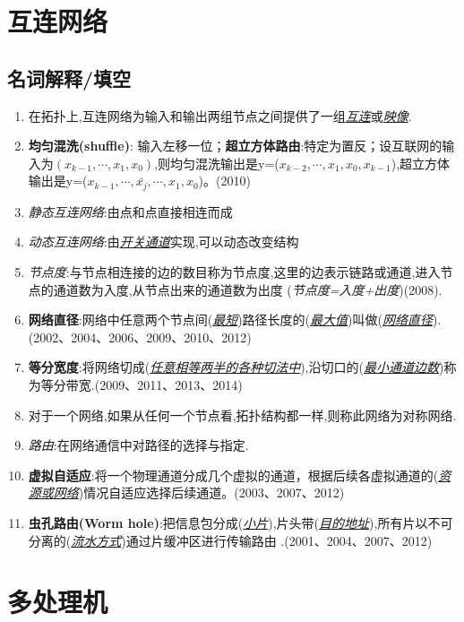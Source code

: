 \documentclass[a4paper]{ctexart}
\newcommand{\blank}[1]{(\emph{\underline{#1}})}
\begin{document}
\newpage
\section{互连网络}
\subsection{名词解释/填空}
\begin{enumerate}
  \item 在拓扑上,互连网络为输入和输出两组节点之间提供了一组\emph{\underline{互连}}或\emph{\underline{映像}}.
  \item \textbf{均匀混洗(shuffle)}: 输入左移一位；\textbf{超立方体路由}:特定为置反；设互联网的输入为$(x_{k-1},\cdots,x_1,x_0)$,则均匀混洗输出是y=\blank{$x_{k-2},\cdots,x_1,x_0,x_{k-1}$},超立方体输出是y=\blank{$x_{k-1},\cdots,\bar{x_j},\cdots,x_1,x_0$}。(2010)
  \item \emph{静态互连网络}:由点和点直接相连而成
  \item \emph{动态互连网络}:由\underline{\emph{开关通道}}实现,可以动态改变结构
  \item \emph{节点度}:与节点相连接的边的数目称为节点度,这里的边表示链路或通道,进入节点的通道数为入度,从节点出来的通道数为出度
  (\emph{节点度=入度+出度})(2008).
  \item \textbf{网络直径}:网络中任意两个节点间\blank{最短}路径长度的\blank{最大值}叫做(\emph{\underline{网络直径}}).(2002、2004、2006、2009、2010、2012)
  \item \textbf{等分宽度}:将网络切成\blank{任意相等两半的各种切法中},沿切口的\blank{最小通道边数}称为等分带宽.(2009、2011、2013、2014)
  \item 对于一个网络,如果从任何一个节点看,拓扑结构都一样,则称此网络为对称网络.
  \item \emph{路由}:在网络通信中对路径的选择与指定.
  \item \textbf{虚拟自适应}:将一个物理通道分成几个虚拟的通道，根据后续各虚拟通道的\blank{资源或网络}情况自适应选择后续通道。(2003、2007、2012)
  \item \textbf{虫孔路由(Worm hole)}:把信息包分成(\emph{\underline{小片}}),片头带(\emph{\underline{目的地址}}),所有片以不可分离的(\emph{\underline{流水方式}})通过片缓冲区进行传输路由 .(2001、2004、2007、2012)
\end{enumerate}

\newpage
\section{多处理机}
\end{document}
